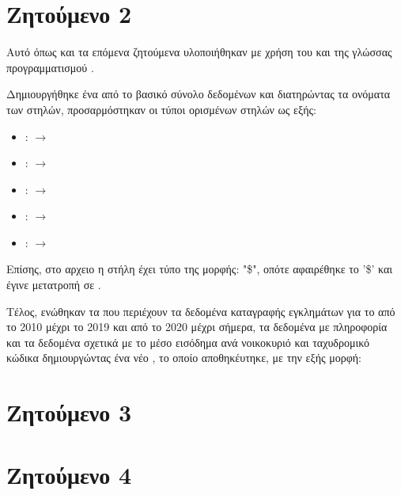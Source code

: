 \documentclass[11pt]{article}
\begin{document}
\section*{Ζητούμενο 2}
Αυτό όπως και τα επόμενα ζητούμενα υλοποιήθηκαν με χρήση του  και της γλώσσας προγραμματισμού .
\par Δημιουργήθηκε ένα  από το βασικό σύνολο δεδομένων και διατηρώντας τα ονόματα των στηλών, προσαρμόστηκαν οι τύποι ορισμένων στηλών ως εξής:
\begin{itemize}
  \item {} :  $\rightarrow$ 
  \item {} :  $\rightarrow$ 
  \item {} :  $\rightarrow$ 
  \item {} :  $\rightarrow$ 
  \item {} :  $\rightarrow$ 
\end{itemize}
\par Επίσης, στο αρχειο  η στήλη   έχει τύπο  της μορφής: "\$", οπότε αφαιρέθηκε το '\$' και έγινε μετατροπή σε .
\par Τέλος, ενώθηκαν τα  που περιέχουν τα δεδομένα καταγραφής εγκλημάτων για το  από το 2010 μέχρι το 2019 και από το 2020 μέχρι σήμερα, τα δεδομένα με  πληροφορία και τα δεδομένα σχετικά με το μέσο εισόδημα ανά νοικοκυριό και ταχυδρομικό κώδικα δημιουργώντας ένα νέο , το οποίο αποθηκέυτηκε, με την εξής μορφή:
\texten{}

\section*{Ζητούμενο 3}


\section*{Ζητούμενο 4}
\end{document}
